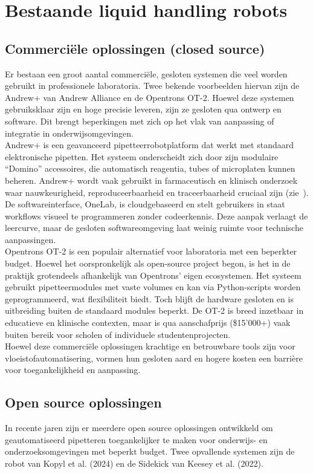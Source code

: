 \section{Bestaande liquid handling robots}
\subsection{Commerciële oplossingen (closed source)}
Er bestaan een groot aantal commerciële, gesloten systemen die veel worden gebruikt in professionele laboratoria. Twee bekende voorbeelden hiervan zijn de Andrew+ van Andrew Alliance en de Opentrons OT-2. Hoewel deze systemen gebruiksklaar zijn en hoge precisie leveren, zijn ze gesloten qua ontwerp en software. Dit brengt beperkingen met zich op het vlak van aanpassing of integratie in onderwijsomgevingen.
\\[12pt]Andrew+ is een geavanceerd pipetteerrobotplatform dat werkt met standaard elektronische pipetten. Het systeem onderscheidt zich door zijn modulaire “Domino” accessoires, die automatisch reagentia, tubes of microplaten kunnen beheren. Andrew+ wordt vaak gebruikt in farmaceutisch en klinisch onderzoek waar nauwkeurigheid, reproduceerbaarheid en traceerbaarheid cruciaal zijn (zie\ \cite{RN44}). De softwareinterface, OneLab, is cloudgebaseerd en stelt gebruikers in staat workflows visueel te programmeren zonder codeerkennis. Deze aanpak verlaagt de leercurve, maar de gesloten softwareomgeving laat weinig ruimte voor technische aanpassingen.
\\[12pt]Opentrons OT-2 is een populair alternatief voor laboratoria met een beperkter budget. Hoewel het oorspronkelijk als open-source project begon, is het in de praktijk grotendeels afhankelijk van Opentrons’ eigen ecosystemen. Het systeem gebruikt pipetteermodules met vaste volumes en kan via Python-scripts worden geprogrammeerd, wat flexibiliteit biedt. Toch blijft de hardware gesloten en is uitbreiding buiten de standaard modules beperkt. De OT-2 is breed inzetbaar in educatieve en klinische contexten, maar is qua aanschafprijs (\$15'000+) vaak buiten bereik voor scholen of individuele studentenprojecten.
\\[12pt]Hoewel deze commerciële oplossingen krachtige en betrouwbare tools zijn voor vloeistofautomatisering, vormen hun gesloten aard en hogere kosten een barrière voor toegankelijkheid en aanpassing.
\subsection{Open source oplossingen}
In recente jaren zijn er meerdere open source oplossingen ontwikkeld om geautomatiseerd pipetteren toegankelijker te maken voor onderwijs- en onderzoeksomgevingen met beperkt budget. Twee opvallende systemen zijn de robot van Kopyl et al. (2024) en de Sidekick van Keesey et al. (2022).

